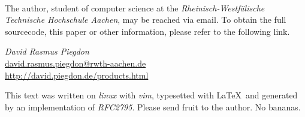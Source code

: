 \documentclass[twoside,a4paper,graphics,11pt,dvips]{article}
\begin{document}
\pagebreak
\begin{small}

%
\ 


The author, student of computer science at the \emph{Rheinisch-Westf\"alische
Technische Hochschule Aachen}, may be reached via email. To obtain the full
sourcecode, this paper or other information, please refer to the following link.

\begin{center}

	\textit{David Rasmus Piegdon} \\
	\href{mailto:david.rasmus.piegdon@rwth-aachen.de}{david.rasmus.piegdon@rwth-aachen.de} \\
	\href{http://david.piegdon.de/products.html}{http://david.piegdon.de/products.html} \\

\end{center}


This text was written on \emph{linux} with \emph{vim}, typesetted with \LaTeX\ and generated by an
implementation of \emph{RFC2795}. Please send fruit to the author. No bananas.

\end{small}

\newpage

\pagestyle{headings}
\tableofcontents

\newpage \pagestyle{headings}


















\end{document}
